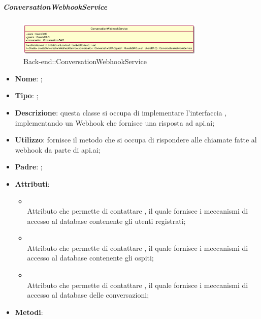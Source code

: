 \hypertarget{ConversationWebhookService_label}{\subparagraph{ConversationWebhookService}}
\begin{figure}[h]
	\centering
	\includegraphics[width=0.80\textwidth,height=\textheight,keepaspectratio]{images/ClassConversationWebhookService.png}
	\caption{Back-end::ConversationWebhookService}
\end{figure}
\begin{itemize}
	\item \textbf{Nome}: ;
	\item \textbf{Tipo}: ;
	\item \textbf{Descrizione}: questa classe si occupa di implementare l'interfaccia , implementando un Webhook che fornisce una risposta ad api.ai;
	\item \textbf{Utilizzo}: fornisce il metodo che si occupa di rispondere alle chiamate fatte al webhook da parte di api.ai;
	\item \textbf{Padre}: ;
	\item \textbf{Attributi}:
	\begin{itemize}
		\item[]  \\
		Attributo che permette di contattare , il quale fornisce i meccanismi di accesso al database contenente gli utenti registrati;
		\item[]  \\
		Attributo che permette di contattare , il quale fornisce i meccanismi di accesso al database contenente gli ospiti;
		\item[]  \\
		Attributo che permette di contattare , il quale fornisce i meccanismi di accesso al database delle conversazioni;
	\end{itemize}
	\item \textbf{Metodi}:
	\begin{itemize}

\end{itemize}
\end{itemize}
